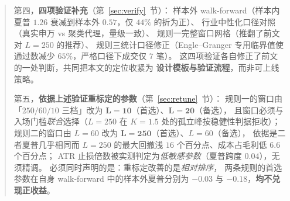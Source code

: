 \documentclass[11pt,a4paper]{ctexart}
\begin{document}
\begin{abstract}
第四，\textbf{四项验证补充}（第~\ref{sec:verify}~节）：
样本外 walk-forward（样本内夏普 $1.26$ 衰减到样本外 $0.57$，仅 $44\%$ 的折为正）、
行业中性化口径对照（真实申万 vs 聚类代理，量级一致）、
规则一完整窗口网格（推翻了前文对 $L=250$ 的推荐）、
规则三统计口径修正（Engle--Granger 专用临界值使通过数减少 $65\%$，严格口径下成交仅 $7$ 笔）。
这四项验证各自修正了前文的一处判断，共同把本文的定位收紧为
\textbf{设计模板与验证流程}，而非可上线策略。

第五，\textbf{依据上述验证重标定的参数}（第~\ref{sec:retune}~节）：
规则一的窗口由「$250/60/10$ 三档」改为 $\mathbf{L=10}$（首选）、$\mathbf{L=20}$（备选），
且窗口必须与入场门槛\emph{联合}选择（$L=250$ 在 $K=1.5$ 处的孤立峰按稳健性判据拒收）；
规则二的窗口由 $L=60$ 改为 $\mathbf{L=250}$（首选）、$L=60$（备选），
依据是二者夏普几乎相同而 $L=250$ 的最大回撤浅 $16$ 个百分点、成本占毛利低 $6.6$ 个百分点；
ATR 止损倍数被实测判定为\emph{低敏感参数}（夏普跨度 $0.04$），无须精调。
必须同时声明的是：重标定改善的是\emph{相对排序}，
两条规则的首选参数在自身 walk-forward 中的样本外夏普分别为 $-0.03$ 与 $-0.18$，\textbf{均不兑现正收益}。
\end{abstract}

\tableofcontents
\newpage














\end{document}
